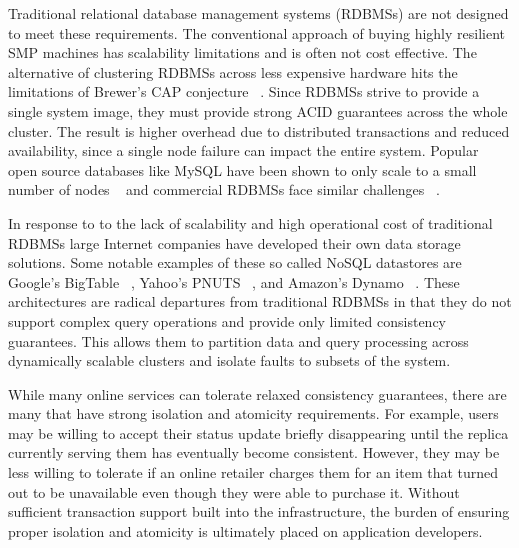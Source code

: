 \documentclass[10pt,final,journal]{IEEEtran}
\begin{document}
Traditional relational database management systems (RDBMSs) are not designed to meet these requirements. The conventional approach of buying highly resilient SMP machines has scalability limitations and is often not cost effective. The alternative of clustering RDBMSs across less expensive hardware hits the limitations of Brewer's CAP conjecture ~\cite{}. Since RDBMSs strive to provide a single system image, they must provide strong ACID guarantees across the whole cluster. The result is higher overhead due to distributed transactions and reduced availability, since a single node failure can impact the entire system. Popular open source databases like MySQL have been shown to only scale to a small number of nodes ~\cite{Malkowski:2010:EAD:1774088.1774449} and commercial RDBMSs face similar challenges ~\cite{Campbell:2010:ESF:1807167.1807280}.

In response to to the lack of scalability and high operational cost of traditional RDBMSs large Internet companies have developed their own data storage solutions. Some notable examples of these so called NoSQL datastores are Google's BigTable ~\cite{Chang:2006:BDS:1267308.1267323}, Yahoo's PNUTS ~\cite{Cooper:2008:PYH:1454159.1454167}, and Amazon's Dynamo ~\cite{DeCandia:2007:DAH:1323293.1294281}. These architectures are radical departures from traditional RDBMSs in that they do not support complex query operations and provide only limited consistency guarantees. This allows them to partition data and query processing across dynamically scalable clusters and isolate faults to subsets of the system.

While many online services can tolerate relaxed consistency guarantees, there are many that have strong isolation and atomicity requirements. For example, users may be willing to accept their status update briefly disappearing until the replica currently serving them has eventually become consistent. However, they may be less willing to tolerate if an online retailer charges them for an item that turned out to be unavailable even though they were able to purchase it. Without sufficient transaction support built into the infrastructure, the burden of ensuring proper isolation and atomicity is ultimately placed on application developers.
\end{document}
